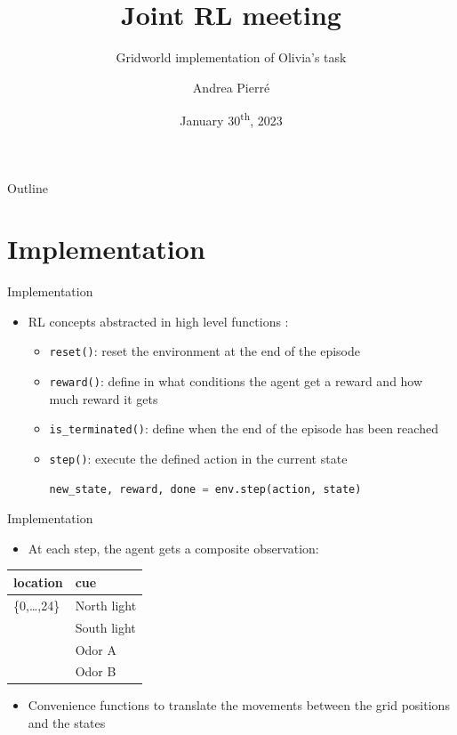 \documentclass[bigger]{beamer}
\author{Andrea Pierré}
\date{January 30\textsuperscript{th}, 2023}
\title{Joint RL meeting}
\subtitle{Gridworld implementation of Olivia's task}
\institute{Brown University}
\begin{document}
\maketitle
\begin{frame}{Outline}
\tableofcontents
\end{frame}

\section{Implementation}
\label{sec:org9dde8a0}
\begin{frame}[<+->][label={sec:orgf5dedb6},fragile]{Implementation}
 \begin{itemize}
\item RL concepts abstracted in high level functions :
\begin{itemize}
\item \texttt{reset()}: reset the environment at the end of the episode
\item \texttt{reward()}: define in what conditions the agent get a reward and how much reward it gets
\item \texttt{is\_terminated()}: define when the end of the episode has been reached
\item \texttt{step()}: execute the defined action in the current state
\scriptsize
\begin{lstlisting}[language={Python}]
new_state, reward, done = env.step(action, state)
\end{lstlisting}
\end{itemize}
\end{itemize}
\end{frame}
\begin{frame}[<+->][label={sec:org2276fa8}]{Implementation}
\begin{itemize}
\item At each step, the agent gets a composite observation:
\end{itemize}
\begin{center}
\begin{tabular}{ll}
\hline
location & cue\\
\hline
\{0,\ldots{},24\} & North light\\
 & South light\\
 & Odor A\\
 & Odor B\\
\hline
\end{tabular}
\end{center}
\begin{itemize}
\item Convenience functions to translate the movements between the grid positions and the states
\end{itemize}
\end{frame}
\end{document}
